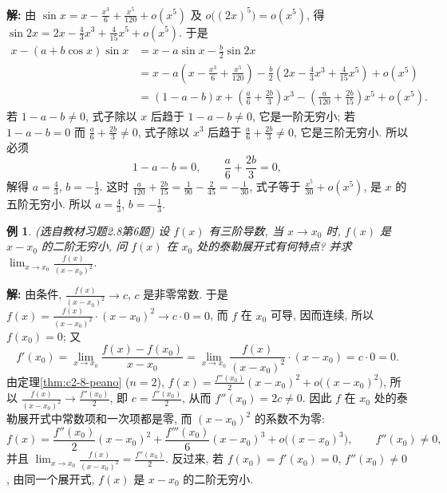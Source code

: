\documentclass[UTF8,openany]{ctexbook}
\theoremstyle{chinesetextbook}
\newtheorem{example}{例}[section]
\newenvironment{cnsolution}{\par\indent\textbf{解:} \ignorespaces}{\par}
\begin{document}
\begin{cnsolution}
由 $\displaystyle\sin x=x-\frac{x^3}6+\frac{x^5}{120}+o(x^5)$ 及 $o\bigl((2x)^5\bigr)=o(x^5)$, 得 $\displaystyle\sin2x=2x-\frac43x^3+\frac4{15}x^5+o(x^5)$. 于是
\[
\begin{aligned}
x-(a+b\cos x)\sin x&=x-a\sin x-\frac b2\sin2x\\
&=x-a\left(x-\frac{x^3}6+\frac{x^5}{120}\right)-\frac b2\left(2x-\frac43x^3+\frac4{15}x^5\right)+o(x^5)\\
&=(1-a-b)x+\left(\frac a6+\frac{2b}3\right)x^3-\left(\frac a{120}+\frac{2b}{15}\right)x^5+o(x^5).
\end{aligned}
\]
若 $1-a-b\ne0$, 式子除以 $x$ 后趋于 $1-a-b\ne0$, 它是一阶无穷小; 若 $1-a-b=0$ 而 $\displaystyle\frac a6+\frac{2b}3\ne0$, 式子除以 $x^3$ 后趋于 $\displaystyle\frac a6+\frac{2b}3\ne0$, 它是三阶无穷小. 所以必须
\[
1-a-b=0,\qquad\frac a6+\frac{2b}3=0,
\]
解得 $\displaystyle a=\frac43$, $\displaystyle b=-\frac13$. 这时 $\displaystyle\frac a{120}+\frac{2b}{15}=\frac1{90}-\frac2{45}=-\frac1{30}$, 式子等于 $\displaystyle\frac{x^5}{30}+o(x^5)$, 是 $x$ 的五阶无穷小. 所以 $\displaystyle a=\frac43$, $\displaystyle b=-\frac13$.
\end{cnsolution}
\begin{example}\label{ex:c2-h8-6}
\textnormal{(选自教材习题2.8第6题)} 设 $f(x)$ 有三阶导数, 当 $x\to x_0$ 时, $f(x)$ 是 $x-x_0$ 的二阶无穷小, 问 $f(x)$ 在 $x_0$ 处的泰勒展开式有何特点? 并求 $\displaystyle\lim_{x\to x_0}\frac{f(x)}{(x-x_0)^2}$.
\end{example}
\begin{cnsolution}
由条件, $\displaystyle\frac{f(x)}{(x-x_0)^2}\to c$, $c$ 是非零常数. 于是 $\displaystyle f(x)=\frac{f(x)}{(x-x_0)^2}\cdot(x-x_0)^2\to c\cdot0=0$, 而 $f$ 在 $x_0$ 可导, 因而连续, 所以 $f(x_0)=0$; 又
\[
f'(x_0)=\lim_{x\to x_0}\frac{f(x)-f(x_0)}{x-x_0}=\lim_{x\to x_0}\frac{f(x)}{(x-x_0)^2}\cdot(x-x_0)=c\cdot0=0.
\]
由定理\ref{thm:c2-8-peano} ($n=2$), $\displaystyle f(x)=\frac{f''(x_0)}2(x-x_0)^2+o\bigl((x-x_0)^2\bigr)$, 所以 $\displaystyle\frac{f(x)}{(x-x_0)^2}\to\frac{f''(x_0)}2$, 即 $\displaystyle c=\frac{f''(x_0)}2$, 从而 $f''(x_0)=2c\ne0$. 因此 $f$ 在 $x_0$ 处的泰勒展开式中常数项和一次项都是零, 而 $(x-x_0)^2$ 的系数不为零:
\[
f(x)=\frac{f''(x_0)}2(x-x_0)^2+\frac{f'''(x_0)}6(x-x_0)^3+o\bigl((x-x_0)^3\bigr),\qquad f''(x_0)\ne0,
\]
并且 $\displaystyle\lim_{x\to x_0}\frac{f(x)}{(x-x_0)^2}=\frac{f''(x_0)}2$. 反过来, 若 $f(x_0)=f'(x_0)=0$, $f''(x_0)\ne0$, 由同一个展开式, $f(x)$ 是 $x-x_0$ 的二阶无穷小.
\end{cnsolution}
\end{document}
